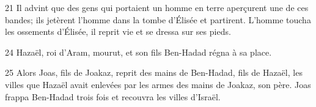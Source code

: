
21 Il advint que des gens qui portaient un homme en terre aperçurent une de ces bandes; ils jetèrent l’homme dans la tombe d’Élisée et partirent. L’homme toucha les ossements d’Élisée, il reprit vie et se dressa sur ses pieds.

24 Hazaël, roi d’Aram, mourut, et son fils Ben-Hadad régna à sa place.

25 Alors Joas, fils de Joakaz, reprit des mains de Ben-Hadad, fils de Hazaël, les villes que Hazaël avait enlevées par les armes des mains de Joakaz, son père. Joas frappa Ben-Hadad trois fois et recouvra les villes d’Israël.